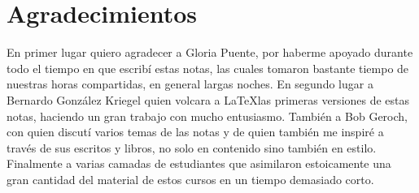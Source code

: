 
%


\chapter*{Agradecimientos}

En primer lugar quiero agradecer a Gloria Puente, por haberme apoyado durante todo el tiempo en que escribí estas notas, las cuales tomaron bastante tiempo de nuestras horas compartidas, en general largas noches.
En segundo lugar a Bernardo González Kriegel quien volcara a \LaTeX  las primeras versiones de estas notas, haciendo un gran trabajo con mucho entusiasmo. 
También a Bob Geroch, con quien discutí varios temas de las notas y de quien 
también me inspiré a través de sus escritos y libros, no solo en contenido sino también en estilo.
Finalmente a varias camadas de estudiantes que asimilaron estoicamente una gran cantidad del material de estos cursos en un tiempo demasiado corto.
% 
% 
% 
% 
% 
